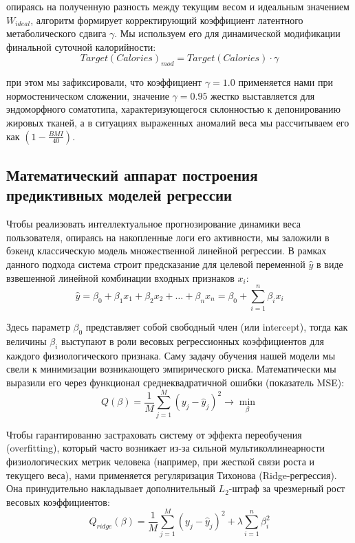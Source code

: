 \documentclass[14pt, a4paper]{extarticle}
\begin{document}
опираясь на полученную разность между текущим весом и идеальным значением $W_{ideal}$, алгоритм формирует корректирующий коэффициент латентного метаболического сдвига $\gamma$. Мы используем его для динамической модификации финальной суточной калорийности:
\begin{equation}
Target(Calories)_{mod} = Target(Calories) \cdot \gamma
\end{equation}

при этом мы зафиксировали, что коэффициент $\gamma = 1.0$ применяется нами при нормостеническом сложении, значение $\gamma = 0.95$ жестко выставляется для эндоморфного соматотипа, характеризующегося склонностью к депонированию жировых тканей, а в ситуациях выраженных аномалий веса мы рассчитываем его как $\left(1 - \frac{BMI}{40}\right)$.


\subsection{Математический аппарат построения предиктивных моделей регрессии}

Чтобы реализовать интеллектуальное прогнозирование динамики веса пользователя, опираясь на накопленные логи его активности, мы заложили в бэкенд классическую модель множественной линейной регрессии. В рамках данного подхода система строит предсказание для целевой переменной $\hat{y}$ в виде взвешенной линейной комбинации входных признаков $x_i$:
\begin{equation}
\hat{y} = \beta_0 + \beta_1 x_1 + \beta_2 x_2 + \dots + \beta_n x_n = \beta_0 + \sum_{i=1}^{n} \beta_i x_i
\end{equation}

Здесь параметр $\beta_0$ представляет собой свободный член (или intercept), тогда как величины $\beta_i$ выступают в роли весовых регрессионных коэффициентов для каждого физиологического признака. Саму задачу обучения нашей модели мы свели к минимизации возникающего эмпирического риска. Математически мы выразили его через функционал среднеквадратичной ошибки (показатель MSE):
\begin{equation}
Q(\beta) = \frac{1}{M} \sum_{j=1}^{M} (y_j - \hat{y}_j)^2 \to \min_{\beta}
\end{equation}

Чтобы гарантированно застраховать систему от эффекта переобучения (overfitting), который часто возникает из-за сильной мультиколлинеарности физиологических метрик человека (например, при жесткой связи роста и текущего веса), нами применяется регуляризация Тихонова (Ridge-регрессия). Она принудительно накладывает дополнительный $L_2$-штраф за чрезмерный рост весовых коэффициентов:
\begin{equation}
Q_{ridge}(\beta) = \frac{1}{M} \sum_{j=1}^{M} (y_j - \hat{y}_j)^2 + \lambda \sum_{i=1}^{n} \beta_i^2
\end{equation}
\end{document}
